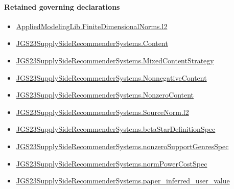 \documentclass[10pt]{article}
\begin{document}
\paragraph{Retained governing declarations}
\begin{itemize}\raggedright
\item \hyperlink{governing-declaration-08313452edb53fe9}{Applied\allowbreak{}Modeling\allowbreak{}Lib.\allowbreak{}Finite\allowbreak{}Dimensional\allowbreak{}Norms.\allowbreak{}l2}
\item \hyperlink{governing-declaration-367305fda50f0ada}{JGS23\allowbreak{}Supply\allowbreak{}Side\allowbreak{}Recommender\allowbreak{}Systems.\allowbreak{}Content}
\item \hyperlink{governing-declaration-2089965d06cf0282}{JGS23\allowbreak{}Supply\allowbreak{}Side\allowbreak{}Recommender\allowbreak{}Systems.\allowbreak{}Mixed\allowbreak{}Content\allowbreak{}Strategy}
\item \hyperlink{governing-declaration-d426babe40b9593c}{JGS23\allowbreak{}Supply\allowbreak{}Side\allowbreak{}Recommender\allowbreak{}Systems.\allowbreak{}Nonnegative\allowbreak{}Content}
\item \hyperlink{governing-declaration-90e2ac7d13788c50}{JGS23\allowbreak{}Supply\allowbreak{}Side\allowbreak{}Recommender\allowbreak{}Systems.\allowbreak{}Nonzero\allowbreak{}Content}
\item \hyperlink{governing-declaration-9299663ffe3ecb38}{JGS23\allowbreak{}Supply\allowbreak{}Side\allowbreak{}Recommender\allowbreak{}Systems.\allowbreak{}Source\allowbreak{}Norm.\allowbreak{}l2}
\item \hyperlink{paper-prerequisite-27ab0f155f5dcf24}{JGS23\allowbreak{}Supply\allowbreak{}Side\allowbreak{}Recommender\allowbreak{}Systems.\allowbreak{}beta\allowbreak{}Star\allowbreak{}Definition\allowbreak{}Spec}
\item \hyperlink{governing-declaration-588c7a0b2af225d7}{JGS23\allowbreak{}Supply\allowbreak{}Side\allowbreak{}Recommender\allowbreak{}Systems.\allowbreak{}nonzero\allowbreak{}Support\allowbreak{}Genres\allowbreak{}Spec}
\item \hyperlink{governing-declaration-6ba13dc1cae95e6e}{JGS23\allowbreak{}Supply\allowbreak{}Side\allowbreak{}Recommender\allowbreak{}Systems.\allowbreak{}norm\allowbreak{}Power\allowbreak{}Cost\allowbreak{}Spec}
\item \hyperlink{governing-declaration-48347eafb3702717}{JGS23\allowbreak{}Supply\allowbreak{}Side\allowbreak{}Recommender\allowbreak{}Systems.\allowbreak{}paper\_\allowbreak{}inferred\_\allowbreak{}user\_\allowbreak{}value}

\end{itemize}
\end{document}
